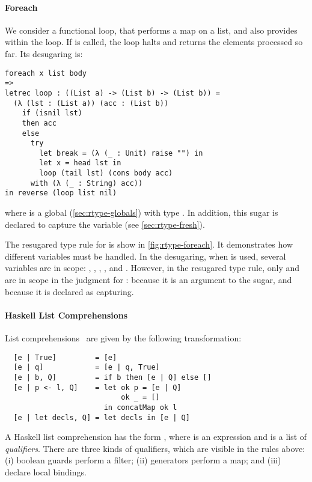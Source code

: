 \paragraph{Foreach}

We consider a functional  loop, that performs a map on a
list, and also provides  within the loop. If 
is called, the loop halts and returns the elements processed so far.
Its desugaring is:
\begin{verbatim}
foreach x list body
=>
letrec loop : ((List a) -> (List b) -> (List b)) =
  (λ (lst : (List a)) (acc : (List b))
    if (isnil lst)
    then acc
    else
      try
        let break = (λ (_ : Unit) raise "") in
        let x = head lst in
        loop (tail lst) (cons body acc)
      with (λ (_ : String) acc))
in reverse (loop list nil)
\end{verbatim}
where  is a global (\cref{sec:rtype-globals})
with type \Code{[i] -> [i]}.
In addition, this sugar is declared to capture the
variable  (see \cref{sec:rtype-fresh}).

The resugared type rule for  is show in \cref{fig:rtype-foreach}.
It demonstrates how different variables must be handled.
In the desugaring, when  is used, several variables are in scope:
, , , , and .
However, in the resugared type rule, only  and 
are in scope in the judgment for :  because
it is an argument to the sugar, and  because it is
declared as capturing.

\begin{figure*}
\begin{prooftree}
\end{prooftree}
\caption{ type rule}\label{fig:rtype-foreach}
\end{figure*}


\paragraph{Haskell List Comprehensions}

List comprehensions~\cite[section 3.11]{haskell-language} are
given by the following transformation:
\begin{verbatim}
  [e | True]         = [e]
  [e | q]            = [e | q, True]
  [e | b, Q]         = if b then [e | Q] else []
  [e | p <- l, Q]    = let ok p = [e | Q]
                           ok _ = []
                       in concatMap ok l
  [e | let decls, Q] = let decls in [e | Q]
\end{verbatim}
A Haskell list comprehension has the form \Code{[e | Q]}, where
 is an expression and  is a list of \emph{qualifiers}.
There are three kinds of qualifiers, which are visible in the rules
above: (i) boolean guards  perform a filter; (ii) generators
 perform a map; and (iii)  declare local
bindings.

